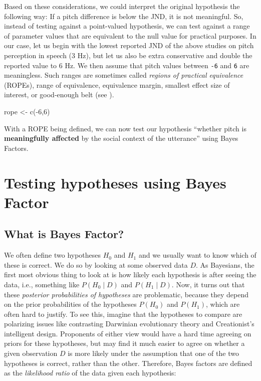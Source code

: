 \documentclass[
  doc,
  floatsintext,
  longtable,
  nolmodern,
  notxfonts,
  notimes,
  colorlinks=true,linkcolor=blue,citecolor=blue,urlcolor=blue]{apa7}
\newenvironment{Shaded}{\begin{snugshade}}{\end{snugshade}}
\newcommand{\DecValTok}[1]{\textcolor[rgb]{0.68,0.00,0.00}{#1}}
\newcommand{\FunctionTok}[1]{\textcolor[rgb]{0.28,0.35,0.67}{#1}}
\newcommand{\NormalTok}[1]{\textcolor[rgb]{0.00,0.23,0.31}{#1}}
\newcommand{\OtherTok}[1]{\textcolor[rgb]{0.00,0.23,0.31}{#1}}
\newcommand{\SpecialCharTok}[1]{\textcolor[rgb]{0.37,0.37,0.37}{#1}}
\begin{document}
Based on these considerations, we could interpret the original
hypothesis the following way: If a pitch difference is below the JND, it
is not meaningful. So, instead of testing against a point-valued
hypothesis, we can test against a range of parameter values that are
equivalent to the null value for practical purposes. In our case, let us
begin with the lowest reported JND of the above studies on pitch
perception in speech (3 Hz), but let us also be extra conservative and
double the reported value to 6 Hz. We then assume that pitch values
between \texttt{-6} and \texttt{6} are meaningless. Such ranges are
sometimes called \emph{regions of practical equivalence} (ROPEs), range
of equivalence, equivalence margin, smallest effect size of interest, or
good-enough belt (see
).

\begin{Shaded}
\begin{Highlighting}[]
\NormalTok{rope }\OtherTok{\textless{}{-}} \FunctionTok{c}\NormalTok{(}\SpecialCharTok{{-}}\DecValTok{6}\NormalTok{,}\DecValTok{6}\NormalTok{)}
\end{Highlighting}
\end{Shaded}

With a ROPE being defined, we can now test our hypothesis ``whether
pitch is \textbf{meaningfully affected} by the social context of the
utterance'' using Bayes Factors.

\section{Testing hypotheses using Bayes
Factor}\label{testing-hypotheses-using-bayes-factor}

\subsection{What is Bayes Factor?}\label{what-is-bayes-factor}

We often define two hypotheses \(H_0\) and \(H_1\) and we usually want
to know which of these is correct. We do so by looking at some observed
data \(D\). As Bayesians, the first most obvious thing to look at is how
likely each hypothesis is after seeing the data, i.e., something like
\(P(H_0 \mid D)\) and \(P(H_1 \mid D)\). Now, it turns out that these
\emph{posterior probabilities of hypotheses} are problematic, because
they depend on the prior probabilities of the hypotheses \(P(H_0)\) and
\(P(H_1)\), which are often hard to justify. To see this, imagine that
the hypotheses to compare are polarizing issues like contrasting
Darwinian evolutionary theory and Creationist's intelligent design.
Proponents of either view would have a hard time agreeing on priors for
these hypotheses, but may find it much easier to agree on whether a
given observation \(D\) is more likely under the assumption that one of
the two hypotheses is correct, rather than the other. Therefore, Bayes
factors are defined as the \emph{likelihood ratio} of the data given
each hypothesis:
\end{document}
